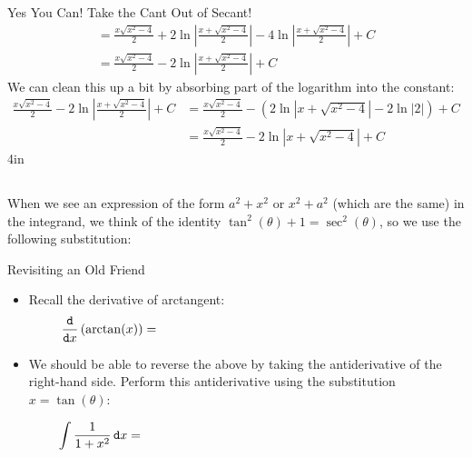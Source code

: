 \begin{exercise}{Yes You Can!  Take the Cant Out of Secant! \Coffeecup \Coffeecup \Coffeecup}
{\begin{align*}
=\frac{x\sqrt{x^2-4}}{2}+2\ln\left|\frac{x+\sqrt{x^2-4}}{2}\right|-4\ln\left|\frac{x+\sqrt{x^2-4}}{2}\right|+C\\
=\frac{x\sqrt{x^2-4}}{2}-2\ln\left|\frac{x+\sqrt{x^2-4}}{2}\right|+C
\end{align*}
We can clean this up a bit by absorbing part of the logarithm into the constant:
\begin{align*}
\frac{x\sqrt{x^2-4}}{2}-2\ln\left|\frac{x+\sqrt{x^2-4}}{2}\right|+C&=\frac{x\sqrt{x^2-4}}{2}-\left(2\ln\left|x+\sqrt{x^2-4}\right|-2\ln|2|\right)+C\\
&=\frac{x\sqrt{x^2-4}}{2}-2\ln\left|x+\sqrt{x^2-4}\right|+C
\end{align*}}{4in}
\end{exercise}

\subsection{} When we see an expression of the form $a^2+x^2$ or $x^2+a^2$ (which are the same) in the integrand, we think of the identity $\tan^2(\theta)+1=\sec^2(\theta)$, so we use the following substitution:


\begin{exercise}{Revisiting an Old Friend \Coffeecup \Coffeecup}
\begin{itemize}
\item Recall the derivative of arctangent:
$$\frac{\dif}{\dif x}\left(\arctan(x)\right)=\hspace{3in} $$

\item We should be able to reverse the above by taking the antiderivative of the right-hand side.  Perform this antiderivative using the substitution $x=\tan(\theta)$:

$$\int \frac{1}{1+x^2}\dif x = \hspace{3.2in} $$

\end{itemize}
\end{exercise}

